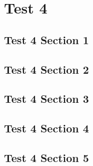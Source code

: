 \chapter{Test 4}
\localtableofcontents
\clearpage

\section{Test 4 Section 1}

\linebreak

\section{Test 4 Section 2}

\linebreak

\section{Test 4 Section 3}

\linebreak

\section{Test 4 Section 4}

\linebreak

\section{Test 4 Section 5}

\linebreak